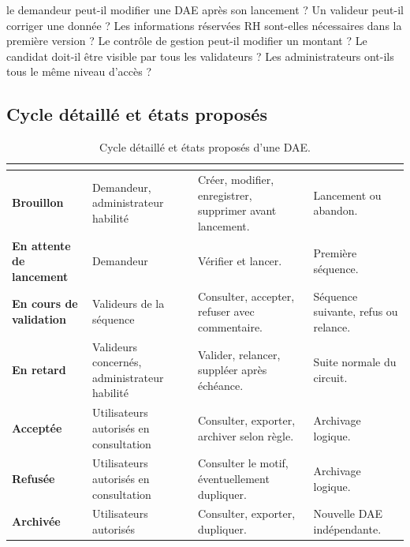 \begin{tcolorbox}[enhanced,colback=orangeClairDAE,colframe=orangeDAE,boxrule=0.6pt,arc=1.5mm]
 le demandeur peut-il modifier une DAE après son lancement ? Un valideur peut-il corriger une donnée ? Les informations réservées RH sont-elles nécessaires dans la première version ? Le contrôle de gestion peut-il modifier un montant ? Le candidat doit-il être visible par tous les validateurs ? Les administrateurs ont-ils tous le même niveau d'accès ?
\end{tcolorbox}

\subsection{Cycle détaillé et états proposés}

\begin{table}[htbp]
\centering
\small
\begin{tabularx}{\textwidth}{>{\bfseries}p{}p{}Yp{0.2\textwidth}}
\toprule
{}
 &  &  &  \\
\midrule
Brouillon & Demandeur, administrateur habilité & Créer, modifier, enregistrer, supprimer avant lancement. & Lancement ou abandon. \\
En attente de lancement & Demandeur & Vérifier et lancer. & Première séquence. \\
En cours de validation & Valideurs de la séquence & Consulter, accepter, refuser avec commentaire. & Séquence suivante, refus ou relance. \\
En retard & Valideurs concernés, administrateur habilité & Valider, relancer, suppléer après échéance. & Suite normale du circuit. \\
Acceptée & Utilisateurs autorisés en consultation & Consulter, exporter, archiver selon règle. & Archivage logique. \\
Refusée & Utilisateurs autorisés en consultation & Consulter le motif, éventuellement dupliquer. & Archivage logique. \\
Archivée & Utilisateurs autorisés & Consulter, exporter, dupliquer. & Nouvelle DAE indépendante. \\
\bottomrule
\end{tabularx}
\caption{Cycle détaillé et états proposés d'une DAE.}
\label{tab:cycle-detaille}
\end{table}

